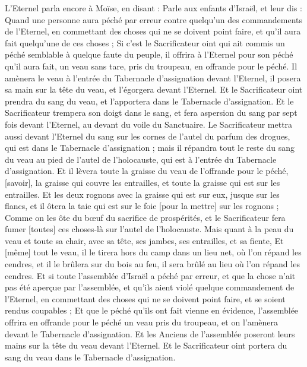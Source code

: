 \begin{multicols}{2}
\VerseOne{}L'Eternel parla encore à Moïse, en disant :
Parle aux enfants d'Israël, et leur dis : Quand une personne aura péché par erreur contre quelqu'un des commandements de l'Eternel, en commettant des choses qui ne se doivent point faire, et qu'il aura fait quelqu'une de ces choses ;
Si c'est le Sacrificateur oint qui ait commis un péché semblable à quelque faute du peuple, il offrira à l'Eternel pour son péché qu'il aura fait, un veau sans tare, pris du troupeau, en offrande pour le péché.
Il amènera le veau à l'entrée du Tabernacle d'assignation devant l'Eternel, il posera sa main sur la tête du veau, et l'égorgera devant l'Eternel.
Et le Sacrificateur oint prendra du sang du veau, et l'apportera dans le Tabernacle d'assignation.
Et le Sacrificateur trempera son doigt dans le sang, et fera aspersion du sang par sept fois devant l'Eternel, au devant du voile du Sanctuaire.
Le Sacrificateur mettra aussi devant l'Eternel du sang sur les cornes de l'autel du parfum des drogues, qui est dans le Tabernacle d'assignation ; mais il répandra tout le reste du sang du veau au pied de l'autel de l'holocauste, qui est à l'entrée du Tabernacle d'assignation.
Et il lèvera toute la graisse du veau de l'offrande pour le péché, [savoir], la graisse qui couvre les entrailles, et toute la graisse qui est sur les entrailles.
Et les deux rognons avec la graisse qui est sur eux, jusque sur les flancs, et il ôtera la taie qui est sur le foie [pour la mettre] sur les rognons ;
Comme on les ôte du bœuf du sacrifice de prospérités, et le Sacrificateur fera fumer [toutes] ces choses-là sur l'autel de l'holocauste.
Mais quant à la peau du veau et toute sa chair, avec sa tête, ses jambes, ses entrailles, et sa fiente,
Et [même] tout le veau, il le tirera hors du camp dans un lieu net, où l'on répand les cendres, et il le brûlera sur du bois au feu, il sera brûlé au lieu où l'on répand les cendres.
Et si toute l'assemblée d'Israël a péché par erreur, et que la chose n'ait pas été aperçue par l'assemblée, et qu'ils aient violé quelque commandement de l'Eternel, en commettant des choses qui ne se doivent point faire, et se soient rendus coupables ;
Et que le péché qu'ils ont fait vienne en évidence, l'assemblée offrira en offrande pour le péché un veau pris du troupeau, et on l'amènera devant le Tabernacle d'assignation.
Et les Anciens de l'assemblée poseront leurs mains sur la tête du veau devant l'Eternel.
Et le Sacrificateur oint portera du sang du veau dans le Tabernacle d'assignation.

\end{multicols}
